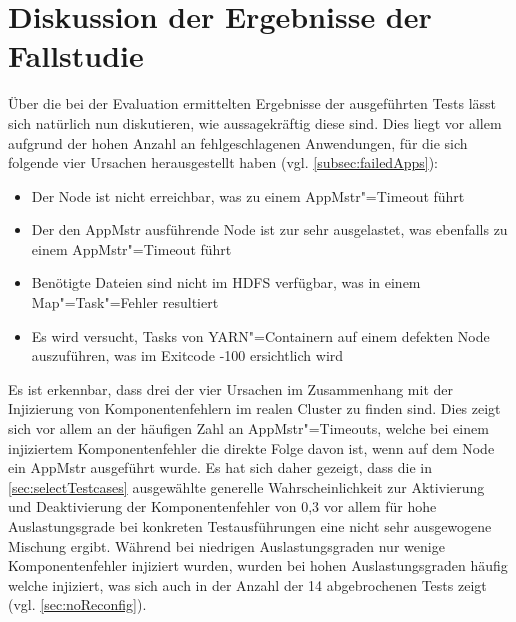 \section{Diskussion der Ergebnisse der Fallstudie}
\label{sec:discussionResults}

Über die bei der Evaluation ermittelten Ergebnisse der ausgeführten Tests lässt sich natürlich nun diskutieren, wie aussagekräftig diese sind.
Dies liegt vor allem aufgrund der hohen Anzahl an fehlgeschlagenen Anwendungen, für die sich folgende vier Ursachen herausgestellt haben (vgl. \cref{subsec:failedApps}):

\begin{itemize}
    \item Der Node ist nicht erreichbar, was zu einem \gls{AppMstr}"=Timeout führt
    \item Der den \gls{AppMstr} ausführende Node ist zur sehr ausgelastet, was ebenfalls zu einem \gls{AppMstr}"=Timeout führt
    \item Benötigte Dateien sind nicht im HDFS verfügbar, was in einem Map"=Task"=Fehler resultiert
    \item Es wird versucht, Tasks von YARN"=Containern auf einem defekten Node auszuführen, was im Exitcode -100 ersichtlich wird
\end{itemize}

Es ist erkennbar, dass drei der vier Ursachen im Zusammenhang mit der Injizierung von Komponentenfehlern im realen Cluster zu finden sind.
Dies zeigt sich vor allem an der häufigen Zahl an \gls{AppMstr}"=Timeouts, welche bei einem injiziertem Komponentenfehler die direkte Folge davon ist, wenn auf dem Node ein \gls{AppMstr} ausgeführt wurde.
Es hat sich daher gezeigt, dass die in \cref{sec:selectTestcases} ausgewählte generelle Wahrscheinlichkeit zur Aktivierung und Deaktivierung der Komponentenfehler von 0,3 vor allem für hohe Auslastungsgrade bei konkreten Testausführungen eine nicht sehr ausgewogene Mischung ergibt.
Während bei niedrigen Auslastungsgraden nur wenige Komponentenfehler injiziert wurden, wurden bei hohen Auslastungsgraden häufig welche injiziert, was sich auch in der Anzahl der 14 abgebrochenen Tests zeigt (vgl. \cref{sec:noReconfig}).

